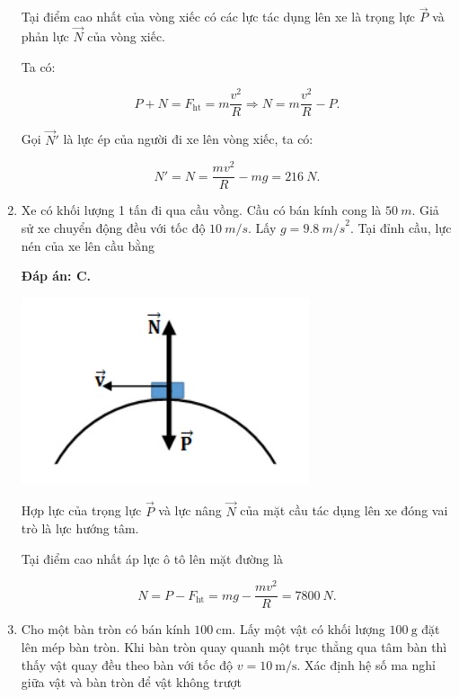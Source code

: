 \begin{enumerate}[label=\bfseries Câu \arabic*:,leftmargin=1.5cm]
{		Tại điểm cao nhất của vòng xiếc có các lực tác dụng lên xe là trọng lực $\vec P$ và phản lực $\vec N$ của vòng xiếc.
		
		Ta có:
		
		$$P + N = F_\text{ht} = m \dfrac{v^2}{R} \Rightarrow N = m \dfrac{v^2}{R} - P.$$
		
		Gọi $\vec N'$ là lực ép của người đi xe lên vòng xiếc, ta có:
		
		$$N' = N = \dfrac{mv^2}{R} - mg = \SI{216}{N}.$$
	}
	\item {}
	
	
	{Xe có khối lượng 1 tấn đi qua cầu vồng. Cầu có bán kính cong là $\SI{50}{m}$. Giả sử xe chuyển động đều với tốc độ $\SI{10}{m/s}$. Lấy $g = \SI{9,8}{m/s}^2$. Tại đỉnh cầu, lực nén của xe lên cầu bằng
	}
	
	\hideall
	{	
		\textbf{Đáp án: C.}
		
		\begin{center}
			\includegraphics[scale=0.6]{../figs/VN10-2022-PH-TP0005-3.jpg}
		\end{center}
		
		Hợp lực của trọng lực $\vec P$ và lực nâng $\vec N$ của mặt cầu tác dụng lên xe đóng vai trò là lực hướng tâm.
		
		Tại điểm cao nhất áp lực ô tô lên mặt đường là
		
		$$ N = P - F_\text{ht} = mg - \dfrac{mv^2}{R} = \SI{7800}{N}.$$
	}
	
	
	\item {}
	
	
	{Cho một bàn tròn có bán kính $\SI{100}{\centi\meter}$. Lấy một vật có khối lượng $\SI{100}{\gram}$ đặt lên mép bàn tròn. Khi bàn tròn quay quanh một trục thẳng qua tâm bàn thì thấy vật quay đều theo bàn với tốc độ $v=\SI{10}{\meter/\second}$. Xác định hệ số ma nghỉ giữa vật và bàn tròn để vật không trượt
	}
	

\end{enumerate}
